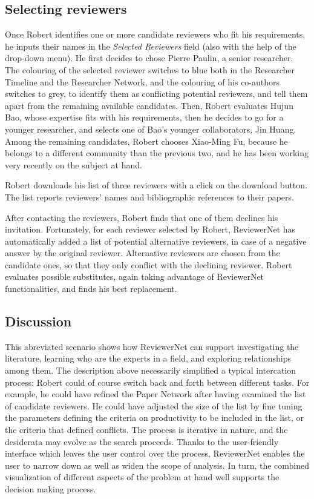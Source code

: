 \subsection{Selecting reviewers} 

Once Robert identifies one or more candidate reviewers who fit his requirements, he inputs their names in the \emph{Selected Reviewers} field (also with the help of the drop-down menu). He first decides to chose Pierre Paulin, a senior researcher. The colouring of the selected reviewer switches to blue both in the Researcher Timeline and the Researcher Network, and the colouring of his co-authors switches to grey, to identify them as conflicting potential reviewers, and tell them apart from the remaining available candidates. Then, Robert evaluates Hujun Bao, whose expertise fits with his requirements, then he decides to go for a younger researcher, and selects one of Bao's younger collaborators, Jin Huang. Among the remaining candidates, Robert chooses Xiao-Ming Fu, because he belongs to a different community than the previous two, and he has been working very recently on the subject at hand. 

Robert downloads his list of three reviewers with a click on the download button. The list reports reviewers' names and bibliographic references to their papers. 

After contacting the reviewers, Robert finds that one of them declines his invitation. Fortunately, for each reviewer selected by Robert, ReviewerNet has automatically added a list of potential alternative reviewers, in case of a negative answer by the original reviewer. Alternative reviewers are chosen from the candidate ones, so that they only conflict with the declining reviewer. Robert evaluates possible substitutes, again taking advantage of ReviewerNet functionalities, and finds his best replacement.  

\subsection{Discussion} 

This abreviated scenario shows how ReviewerNet can support investigating the literature, learning who are the experts in a field, and exploring relationships among them. The description above necessarily simplified a typical intercation process: Robert could of course switch back and forth between different tasks. For example, he could have refined the Paper Network after having examined the list of candidate reviewers. He could have adjusted the size of the list by fine tuning the parameters defining the criteria on productivity to be included in the list, or the criteria that defined conflicts. The process is iterative in nature, and the desiderata may evolve as the search proceeds. Thanks to the user-friendly interface which leaves the user control over the process, ReviewerNet enables the user to narrow down as well as widen the scope of analysis. In turn, the combined visualization of different aspects of the problem at hand well supports the decision making process.     

